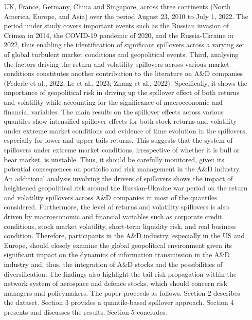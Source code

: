 \documentclass[
  letterpaper,
  DIV=11,
  numbers=noendperiod]{scrartcl}
\begin{document}
UK, France, Germany, China and Singapore, across three continents (North
America, Europe, and Asia) over the period August 23, 2010 to July 1,
2022. The period under study covers important events such as the Russian
invasion of Crimea in 2014, the COVID-19 pandemic of 2020, and the
Russia-Ukraine in 2022, thus enabling the identification of significant
spillovers across a varying set of global turbulent market conditions
and geopolitical events. Third, analysing the factors driving the return
and volatility spillovers across various market conditions constitutes
another contribution to the literature on A\&D companies (Federle et
al., 2022; Le et al., 2023; Zhang et al., 2022). Specifically, it shows
the importance of geopolitical risk in driving up the spillover effect
of both returns and volatility while accounting for the significance of
macroeconomic and financial variables. The main results on the spillover
effects across various quantiles show intensified spillover effects for
both stock returns and volatility under extreme market conditions and
evidence of time evolution in the spillovers, especially for lower and
upper tails returns. This suggests that the system of spillovers under
extreme market conditions, irrespective of whether it is bull or bear
market, is unstable. Thus, it should be carefully monitored, given its
potential consequences on portfolio and risk management in the A\&D
industry. An additional analysis involving the drivers of spillovers
shows the impact of heightened geopolitical risk around the
Russian-Ukraine war period on the return and volatility spillovers
across A\&D companies in most of the quantiles considered. Furthermore,
the level of returns and volatility spillovers is also driven by
macroeconomic and financial variables such as corporate credit
conditions, stock market volatility, short-term liquidity risk, and real
business condition. Therefore, participants in the A\&D industry,
especially in the US and Europe, should closely examine the global
geopolitical environment given its significant impact on the dynamics of
information transmission in the A\&D industry and, thus, the integration
of A\&D stocks and the possibilities of diversification. The findings
also highlight the tail risk propagation within the network system of
aerospace and defence stocks, which should concern risk managers and
policymakers. The paper proceeds as follows. Section 2 describes the
dataset. Section 3 provides a quantile-based spillover approach. Section
4 presents and discusses the results. Section 5 concludes.
\end{document}
